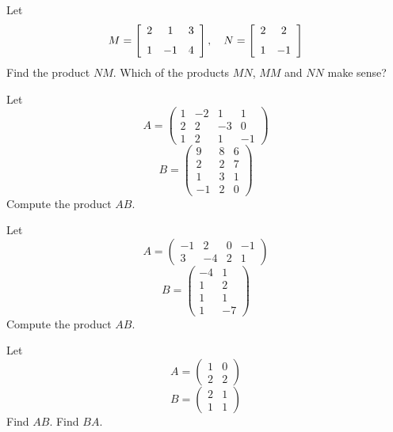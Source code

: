 \documentclass[12pt]{amsbook}
\numberwithin{equation}{section}
\theoremstyle{plain} %
\theoremstyle{definition}
\theoremstyle{remark}
\begin{document}
\bigskip

\begin{Exercise}[title={A simple product}, difficulty = 0, label = exmm]
\Question	Let
	$$M =  \left[ \begin {array}{ccc} 
	2  & 1  & 3 \\ \noalign{\medskip}            
	1  & -1  & 4 \end {array}
	\right], \quad N=
	\left[ \begin {array}{cc} 
	2  & 2 \\ \noalign{\medskip}             
	1  & -1\end {array}
	\right] 
	$$
\Question	Find the product $NM$.  Which of the products $MN$, $MM$ and $NN$ make sense?
\end{Exercise}



\begin{Exercise}[title={Matrix Multiplication}, difficulty = 0, label = exmm]
	Let
	$$A = \left( \begin{array}{rrrr}
	1 & -2 & 1 & 1\\
	2 & 2 & -3 &0\\
	1 & 2 & 1 &-1\end{array} \right)$$
	$$B = \left( \begin{array}{rrr}
	9 & 8 & 6 \\
	2 & 2 & 7\\
	1 & 3 & 1 \\
	-1 &2 &0\end{array} \right)$$
	Compute the product $AB$.
\end{Exercise}
\bigskip


\begin{Exercise}[title={Matrix Multiplication}, difficulty = 0, label = exmm]
	Let
	$$A = \left( \begin{array}{rrrr}
	-1 & 2 & 0 & -1\\
	3 & -4 & 2 &1\end{array} \right)$$
	$$B = \left( \begin{array}{rrr}
	-4 & 1 \\
	1 & 2\\
	1 & 1 \\
	1 &-7\end{array} \right)$$
	Compute the product $AB$.
\end{Exercise}
\bigskip


\bigskip

\begin{Exercise}[title={$AB \ne BA$}, difficulty = 0, label = exmm]
Let
$$A = \left( \begin{array}{rr}
1 & 0\\
2 & 2 \end{array} \right)$$
$$B = \left( \begin{array}{rr}
2 & 1\\
1 & 1 \end{array} \right)$$
\Question Find $AB$.
\Question Find $BA$.
\end{Exercise}
\bigskip
\end{document}
